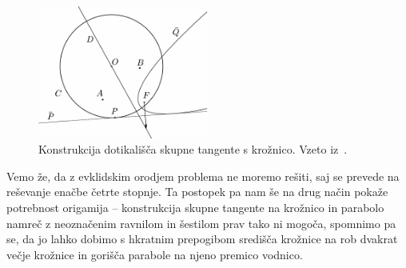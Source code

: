 \begin{figure}[h]
    \centering
    \includegraphics[width=0.5\textwidth]{images/alhazen/nishimura_resitev.png}
    \caption[Nishimurijeva rešitev]{Konstrukcija dotikališča skupne tangente s krožnico. Vzeto iz~\cite[str.\ 40]{nishimura2018}.}
    \label{fig:nishimura_resitev}
\end{figure}

Vemo že, da z evklidskim orodjem problema ne moremo rešiti, saj se prevede na reševanje enačbe četrte stopnje. Ta postopek pa nam še na drug način pokaže potrebnost origamija -- konstrukcija skupne tangente na krožnico in parabolo namreč z neoznačenim ravnilom in šestilom prav tako ni mogoča, spomnimo pa se, da jo lahko dobimo s hkratnim prepogibom središča krožnice na rob dvakrat večje krožnice in gorišča parabole na njeno premico vodnico.

